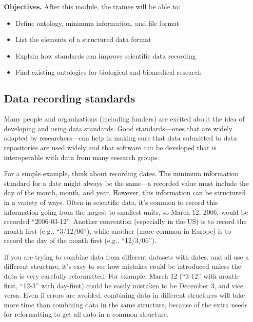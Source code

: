 \documentclass[]{tufte-book}
\providecommand{\tightlist}{%
  \setlength{\itemsep}{0pt}\setlength{\parskip}{0pt}}
\begin{document}
\textbf{Objectives.} After this module, the trainee will be able to:

\begin{itemize}
\tightlist
\item
  Define ontology, minimum information, and file format
\item
  List the elements of a structured data format
\item
  Explain how standards can improve scientific data recording
\item
  Find existing ontologies for biological and biomedical research
\end{itemize}

\subsection{Data recording standards}\label{data-recording-standards}

Many people and organizations (including funders) are excited about the idea of
developing and using data standards. Good standards---ones that are widely
adapted by researchers---can help in making sure that data submitted to data
repositories are used widely and that software can be developed that is
interoperable with data from many research groups.

For a simple example, think about recording dates. The minimum
information standard for a date might always be the same---a recorded value
must include the day of the month, month, and year. However, this information
can be structured in a variety of ways. Often in scientific data, it's common
to record this information going from the largest to smallest units, so March
12, 2006, would be recorded ``2006-03-12''. Another convention (especially in the
US) is to record the month first (e.g., ``3/12/06''), while another (more common
in Europe) is to record the day of the month first (e.g., ``12/3/06'').

If you are trying to combine data from different datasets with dates, and all
use a different structure, it's easy to see how mistakes could be introduced
unless the data is very carefully reformatted. For example, March 12 (``3-12''
with month-first, ``12-3'' with day-first) could be easily mistaken to be December
3, and vice versa. Even if errors are avoided, combining data in different
structures will take more time than combining data in the same structure,
because of the extra needs for reformatting to get all data in a common
structure.
\end{document}
